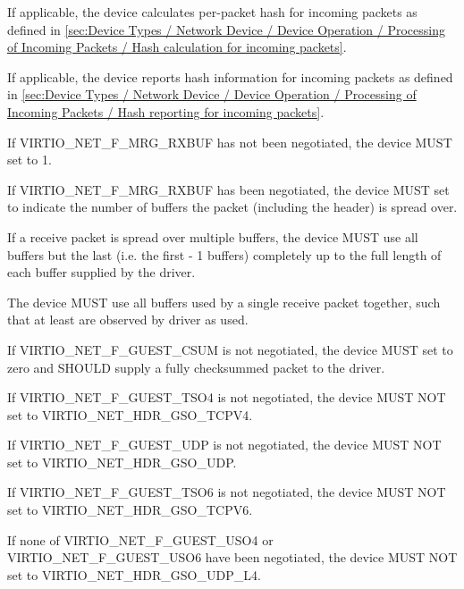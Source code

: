 If applicable, the device calculates per-packet hash for incoming packets as
defined in \ref{sec:Device Types / Network Device / Device Operation / Processing of Incoming Packets / Hash calculation for incoming packets}.

If applicable, the device reports hash information for incoming packets as
defined in \ref{sec:Device Types / Network Device / Device Operation / Processing of Incoming Packets / Hash reporting for incoming packets}.

\label{devicenormative:Device Types / Network Device / Device Operation / Processing of Packets}%

If VIRTIO_NET_F_MRG_RXBUF has not been negotiated, the device MUST set
 to 1.

If VIRTIO_NET_F_MRG_RXBUF has been negotiated, the device MUST set
 to indicate the number of buffers
the packet (including the header) is spread over.

If a receive packet is spread over multiple buffers, the device
MUST use all buffers but the last (i.e. the first  -
1 buffers) completely up to the full length of each buffer
supplied by the driver.

The device MUST use all buffers used by a single receive
packet together, such that at least  are
observed by driver as used.

If VIRTIO_NET_F_GUEST_CSUM is not negotiated, the device MUST set
 to zero and SHOULD supply a fully checksummed
packet to the driver.

If VIRTIO_NET_F_GUEST_TSO4 is not negotiated, the device MUST NOT set
 to VIRTIO_NET_HDR_GSO_TCPV4.

If VIRTIO_NET_F_GUEST_UDP is not negotiated, the device MUST NOT set
 to VIRTIO_NET_HDR_GSO_UDP.

If VIRTIO_NET_F_GUEST_TSO6 is not negotiated, the device MUST NOT set
 to VIRTIO_NET_HDR_GSO_TCPV6.

If none of VIRTIO_NET_F_GUEST_USO4 or VIRTIO_NET_F_GUEST_USO6 have been negotiated,
the device MUST NOT set  to VIRTIO_NET_HDR_GSO_UDP_L4.

